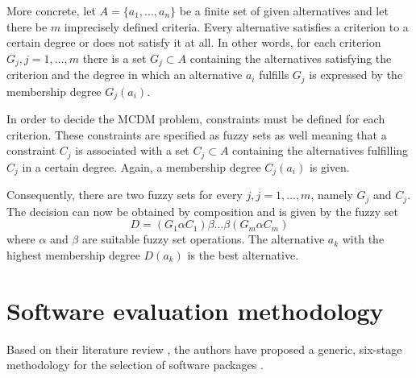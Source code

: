 More concrete, let $A = \{a_1, \ldots, a_n\}$ be a finite set of given alternatives and let there be $m$ imprecisely defined criteria. Every alternative satisfies a criterion to a certain degree or does not satisfy it at all. In other words, for each criterion $G_j, j = 1, \ldots, m$ there is a set $G_j \subset A$ containing the alternatives satisfying the criterion and the degree in which an alternative $a_i$ fulfills $G_j$ is expressed by the membership degree $G_j(a_i)$.

In order to decide the MCDM problem, constraints must be defined for each criterion. These constraints are specified as fuzzy sets as well meaning that a constraint $C_j$ is associated with a set $C_j \subset A$ containing the alternatives fulfilling $C_j$ in a certain degree. Again, a membership degree $C_j(a_i)$ is given.

Consequently, there are two fuzzy sets for every $j, j = 1, \ldots, m$, namely $G_j$ and $C_j$. The decision can now be obtained by composition and is given by the fuzzy set 
\begin{equation}
    D = (G_1 \alpha C_1) \beta \ldots \beta (G_m \alpha C_m)
\end{equation}
where $\alpha$ and $\beta$ are suitable fuzzy set operations. The alternative $a_k$ with the highest membership degree $D(a_k)$ is the best alternative.



\section{Software evaluation methodology}
\label{sec:sw-selection}

Based on their literature review \cite{Jadhav:2009}, the authors have proposed a generic, six-stage methodology for the selection of software packages \cite{Jadhav:2011}.

